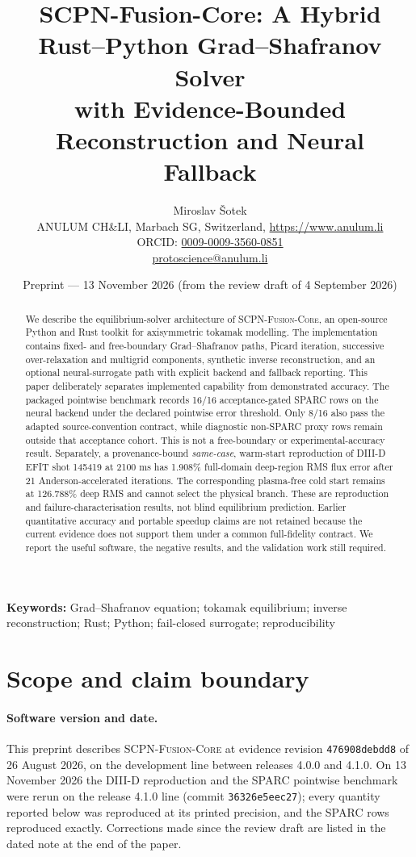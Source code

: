 \documentclass[11pt]{article}
\title{SCPN-Fusion-Core: A Hybrid Rust--Python Grad--Shafranov Solver\\
with Evidence-Bounded Reconstruction and Neural Fallback}
\author{Miroslav \v{S}otek\\
\small ANULUM CH\&LI, Marbach SG, Switzerland, \url{https://www.anulum.li}\\
\small ORCID: \href{https://orcid.org/0009-0009-3560-0851}{0009-0009-3560-0851}\\
\small \href{mailto:protoscience@anulum.li}{protoscience@anulum.li}}
\date{Preprint --- 13 November 2026 (from the review draft of 4 September 2026)}
\newcommand{\code}[1]{\texttt{#1}}
\newcommand{\scpn}{\textsc{SCPN-Fusion-Core}}
\begin{document}
\maketitle

\begin{abstract}
We describe the equilibrium-solver architecture of \scpn{}, an open-source
Python and Rust toolkit for axisymmetric tokamak modelling.  The implementation
contains fixed- and free-boundary Grad--Shafranov paths, Picard iteration,
successive over-relaxation and multigrid components, synthetic inverse
reconstruction, and an optional neural-surrogate path with explicit backend and
fallback reporting.  This paper deliberately separates implemented
capability from demonstrated accuracy.  The packaged pointwise benchmark
records 16/16 acceptance-gated SPARC rows on the neural backend under the
declared pointwise error threshold.  Only 8/16 also pass the adapted
source-convention contract, while diagnostic non-SPARC proxy rows remain
outside that acceptance cohort.  This is not a free-boundary or
experimental-accuracy result.  Separately, a provenance-bound
\emph{same-case}, warm-start reproduction of DIII-D EFIT shot 145419 at 2100 ms
has 1.908\% full-domain deep-region RMS flux error after 21
Anderson-accelerated iterations.  The corresponding plasma-free cold start
remains at 126.788\% deep RMS and cannot select the physical branch.  These are
reproduction and failure-characterisation results, not blind equilibrium
prediction.  Earlier quantitative accuracy and portable speedup claims are not
retained because the current evidence does not support them under a common
full-fidelity contract.  We report the useful
software, the negative results, and the validation work still required.
\end{abstract}

\noindent\textbf{Keywords:} Grad--Shafranov equation; tokamak equilibrium;
inverse reconstruction; Rust; Python; fail-closed surrogate; reproducibility

\section{Scope and claim boundary}

\paragraph{Software version and date.} This preprint describes \scpn{} at
evidence revision \code{476908debdd8} of 26 August 2026, on the development
line between releases 4.0.0 and 4.1.0.  On 13 November 2026 the DIII-D
reproduction and the SPARC pointwise benchmark were rerun on the release 4.1.0
line (commit \code{36326e5eec27}); every quantity reported below was
reproduced at its printed precision, and the SPARC rows reproduced exactly.
Corrections made since the review draft are listed in the dated note at the
end of the paper.
\end{document}
